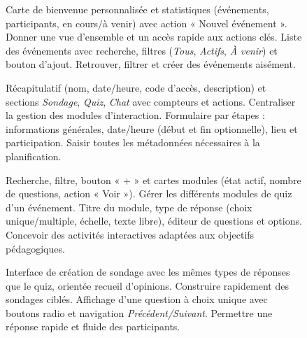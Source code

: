 \begin{figure}[htbp]
  \centering
     {Carte de bienvenue personnalisée et statistiques (événements, participants, en cours/à venir) avec action « Nouvel événement ».}%
     {Donner une vue d'ensemble et un accès rapide aux actions clés.}
  \hfill
     {Liste des événements avec recherche, filtres (\emph{Tous}, \emph{Actifs}, \emph{À venir}) et bouton d'ajout.}%
     {Retrouver, filtrer et créer des événements aisément.}
\end{figure}

\begin{figure}[htbp]
  \centering
     {Récapitulatif (nom, date/heure, code d'accès, description) et sections \emph{Sondage}, \emph{Quiz}, \emph{Chat} avec compteurs et actions.}%
     {Centraliser la gestion des modules d'interaction.}
  \hfill
     {Formulaire par étapes : informations générales, date/heure (début et fin optionnelle), lieu et participation.}%
     {Saisir toutes les métadonnées nécessaires à la planification.}
\end{figure}

\begin{figure}[htbp]
  \centering
     {Recherche, filtre, bouton « + » et cartes modules (état actif, nombre de questions, action « Voir »).}%
     {Gérer les différents modules de quiz d'un événement.}
  \hfill
     {Titre du module, type de réponse (choix unique/multiple, échelle, texte libre), éditeur de questions et options.}%
     {Concevoir des activités interactives adaptées aux objectifs pédagogiques.}
\end{figure}

\begin{figure}[htbp]
  \centering
     {Interface de création de sondage avec les mêmes types de réponses que le quiz, orientée recueil d'opinions.}%
     {Construire rapidement des sondages ciblés.}
  \hfill
     {Affichage d'une question à choix unique avec boutons radio et navigation \emph{Précédent/Suivant}.}%
     {Permettre une réponse rapide et fluide des participants.}
\end{figure}

